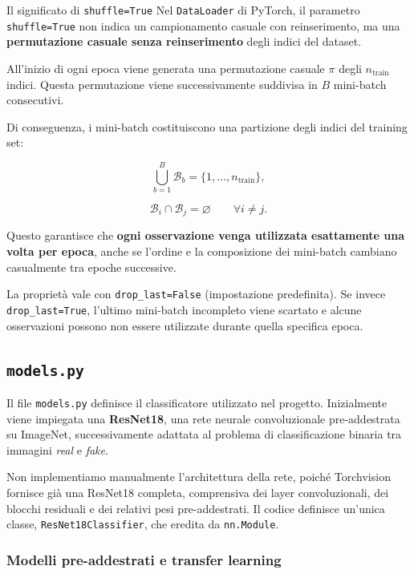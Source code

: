 \documentclass[10pt,a4paper,oneside]{book}
\begin{document}
\begin{warningbox}{Il significato di \texttt{shuffle=True}}
Nel \texttt{DataLoader} di PyTorch, il parametro
\texttt{shuffle=True} non indica un campionamento casuale
con reinserimento, ma una \textbf{permutazione casuale
senza reinserimento} degli indici del dataset.

All'inizio di ogni epoca viene generata una permutazione
casuale $\pi$ degli $n_{\mathrm{train}}$ indici. Questa
permutazione viene successivamente suddivisa in $B$
mini-batch consecutivi.

Di conseguenza, i mini-batch costituiscono una partizione
degli indici del training set:

\[
\bigcup_{b=1}^{B}\mathcal{B}_b
=
\{1,\ldots,n_{\mathrm{train}}\},
\]

\[
\mathcal{B}_i \cap \mathcal{B}_j
=
\varnothing
\qquad \forall i\neq j.
\]

Questo garantisce che \textbf{ogni osservazione venga
utilizzata esattamente una volta per epoca}, anche se
l'ordine e la composizione dei mini-batch cambiano
casualmente tra epoche successive.

La proprietà vale con \texttt{drop\_last=False}
(impostazione predefinita). Se invece
\texttt{drop\_last=True}, l'ultimo mini-batch incompleto
viene scartato e alcune osservazioni possono non essere
utilizzate durante quella specifica epoca.
\end{warningbox}



\subsection{\texttt{models.py}}

Il file \texttt{models.py} definisce il classificatore utilizzato
nel progetto. Inizialmente viene impiegata una \textbf{ResNet18},
una rete neurale convoluzionale pre-addestrata su ImageNet,
successivamente adattata al problema di classificazione binaria
tra immagini \textit{real} e \textit{fake}.

Non implementiamo manualmente l'architettura della rete, poiché
Torchvision fornisce già una ResNet18 completa, comprensiva
dei layer convoluzionali, dei blocchi residuali e dei relativi
pesi pre-addestrati. Il codice definisce un'unica classe, \texttt{ResNet18Classifier},
che eredita da \texttt{nn.Module}.

\subsubsection{Modelli pre-addestrati e transfer learning}
\end{document}
